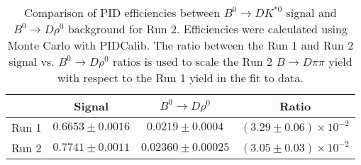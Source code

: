 \begin{table}
    \centering
    \begin{tabular}{cccc}
        \toprule
        & Signal & $B^0 \to D\rho^0$ & Ratio \\
        \midrule
Run 1 & $0.6653 \pm 0.0016$ & $0.0219 \pm 0.0004$ & $(3.29 \pm 0.06) \times 10^{-2}$ \\
Run 2 & $0.7741 \pm 0.0011$ & $0.02360 \pm 0.00025$ & $(3.05 \pm 0.03) \times 10^{-2}$ \\
      \bottomrule
        \end{tabular}
        \caption{Comparison of PID efficiencies between $B^0 \to DK^{*0}$ signal and $B^0 \to D\rho^0$ background for  Run 2. Efficiencies were calculated using Monte Carlo with PIDCalib. The ratio between the Run 1 and Run 2 signal vs. $B^0 \to D\rho^0$ ratios is used to scale the Run 2 $B \to D\pi\pi$ yield with respect to the Run 1 yield in the fit to data.}
\label{tab:rho_PID_eff}
\end{table}
